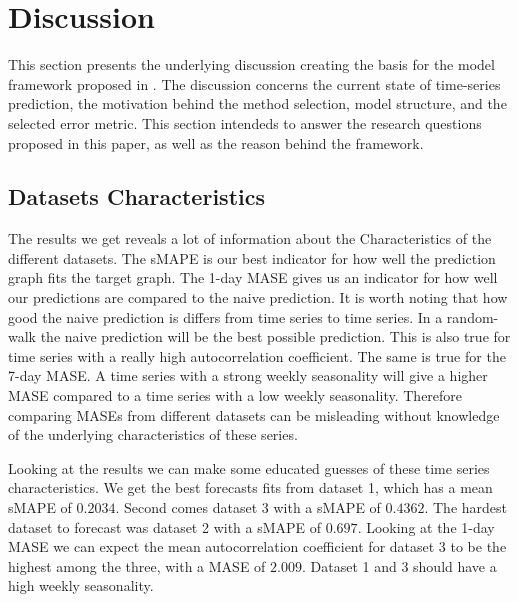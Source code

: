 
\section{Discussion}
\label{section:Discussion:Discussion}


This section presents the underlying discussion creating the basis for the model framework proposed in .
The discussion concerns the current state of time-series prediction, the motivation behind the method selection, model structure, and the selected error metric.
This section intendeds to answer the research questions proposed in this paper,
as well as the reason behind the framework.



\subsection{Datasets Characteristics}
The results we get reveals a lot of information about the Characteristics of the different datasets.
The sMAPE is our best indicator for how well the prediction graph fits the target graph.
The 1-day MASE gives us an indicator for how well our predictions are compared to the naive
prediction. It is worth noting that how good the naive prediction is differs from time series
to time series. In a random-walk the naive prediction will be the best possible prediction.
This is also true for time series with a really high autocorrelation coefficient.
The same is true for the 7-day MASE. A time series with a strong weekly seasonality will
give a higher MASE compared to a time series with a low weekly seasonality.
Therefore comparing MASEs from different datasets can be misleading without knowledge of
the underlying characteristics of these series.

Looking at the results we can make some educated guesses of these time series characteristics.
We get the best forecasts fits from dataset 1, which has a mean sMAPE of $0.2034$.
Second comes dataset 3 with a sMAPE of $0.4362$. The hardest dataset to forecast was dataset 2 with a
sMAPE of $0.697$. Looking at the 1-day MASE we can expect the mean autocorrelation coefficient for
dataset 3 to be the highest among the three, with a MASE of $2.009$.
Dataset 1 and 3 should have a high weekly seasonality.

